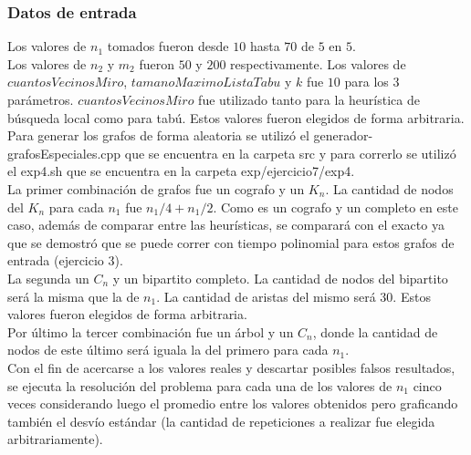 \subsubsection*{Datos de entrada}\;

\noindent Los valores de $n_1$ tomados fueron desde $10$ hasta $70$ de $5$ en $5$. \\
       Los valores de $n_2$ y $m_2$ fueron $50$ y $200$ respectivamente. Los valores de $cuantosVecinosMiro$, $tamanoMaximoListaTabu$ y $k$ fue $10$ para los $3$ parámetros. $cuantosVecinosMiro$ fue utilizado tanto para la heurística de búsqueda local como para tabú. Estos valores fueron elegidos de forma arbitraria. \\
        Para generar los grafos de forma aleatoria se utilizó el generador-grafosEspeciales.cpp que se encuentra en la carpeta src y para correrlo se utilizó el exp4.sh que se encuentra en la carpeta exp/ejercicio7/exp4. \\
        La primer combinación de grafos fue un cografo y un $K_n$. La cantidad de nodos del $K_n$ para cada $n_1$ fue $n_1/4+n_1/2$. Como es un cografo y un completo en este caso, además de comparar entre las heurísticas, se comparará con el exacto ya que se demostró que se puede correr con tiempo polinomial para estos grafos de entrada (ejercicio 3).\\
        La segunda un $C_n$ y un bipartito completo. La cantidad de nodos del bipartito será la misma que la de $n_1$. La cantidad de aristas del mismo será 30. Estos valores fueron elegidos de forma arbitraria. \\
        Por último la tercer combinación fue un árbol y un $C_n$, donde la cantidad de nodos de este último será iguala la del primero para cada $n_1$.\\
        Con el fin de acercarse a los valores reales y descartar posibles falsos resultados, se ejecuta la resolución del problema para cada una de los valores de $n_1$ cinco veces considerando luego el promedio entre los valores obtenidos pero graficando también el desvío estándar (la cantidad de repeticiones a realizar fue elegida arbitrariamente).\; 
